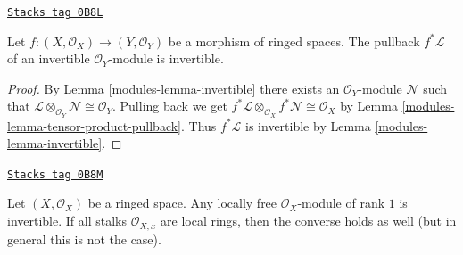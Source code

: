 \begin{lemma}
\label{modules-lemma-pullback-invertible}
\href{https://stacks.math.columbia.edu/tag/0B8L}{\texttt{Stacks tag 0B8L}}

Let $f : (X, \mathcal{O}_X) \to (Y, \mathcal{O}_Y)$ be a
morphism of ringed spaces. The pullback $f^*\mathcal{L}$ of an
invertible $\mathcal{O}_Y$-module is invertible.
\end{lemma}

\begin{proof}

By Lemma \ref{modules-lemma-invertible}
there exists an $\mathcal{O}_Y$-module $\mathcal{N}$ such that
$\mathcal{L} \otimes_{\mathcal{O}_Y} \mathcal{N} \cong \mathcal{O}_Y$.
Pulling back we get
$f^*\mathcal{L} \otimes_{\mathcal{O}_X} f^*\mathcal{N} \cong \mathcal{O}_X$
by Lemma \ref{modules-lemma-tensor-product-pullback}.
Thus $f^*\mathcal{L}$ is invertible by Lemma \ref{modules-lemma-invertible}.
\end{proof}

\begin{lemma}
\label{modules-lemma-invertible-is-locally-free-rank-1}
\href{https://stacks.math.columbia.edu/tag/0B8M}{\texttt{Stacks tag 0B8M}}

Let $(X, \mathcal{O}_X)$ be a ringed space. Any locally free
$\mathcal{O}_X$-module of rank $1$ is invertible.
If all stalks $\mathcal{O}_{X, x}$ are local rings, then
the converse holds as well (but in general this is not the case).
\end{lemma}


